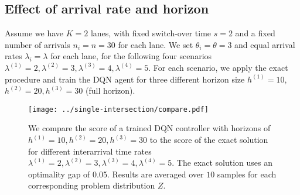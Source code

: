 \documentclass{article}
\theoremstyle{definition}
\theoremstyle{plain}
\begin{document}
\subsection{Effect of arrival rate and horizon}
%
Assume we have $K=2$ lanes, with fixed switch-over time $s=2$ and a fixed number
of arrivals $n_{i}=n=30$ for each lane. We set $\theta_{i} = \theta = 3$ and
equal arrival rates $\lambda_{i} = \lambda$ for each lane, for the following
four scenarios $\lambda^{(1)} = 2, \lambda^{(2)} = 3, \lambda^{(3)} = 4, \lambda^{(4)} = 5$.
%
For each scenario, we apply the exact procedure and train the DQN agent for
three different horizon size $h^{(1)} = 10$, $h^{(2)} = 20, h^{(3)} = 30$ (full
horizon).


\begin{figure}
  \centering
  \texttt{[image: ../single-intersection/compare.pdf]}
  \caption{We compare the score of a trained DQN controller with horizons of
    $h^{(1)} = 10, h^{(2)} = 20, h^{(3)} = 30$ to the score of the exact
    solution for different interarrival time rates
    $\lambda^{(1)} = 2, \lambda^{(2)} = 3, \lambda^{(3)} = 4, \lambda^{(4)} = 5$. The exact solution
    uses an optimality gap of 0.05. Results are averaged over $10$ samples for
    each corresponding problem distribution $Z$.}
  \label{fig:dqn-learning-rates}
\end{figure}



% 
% 
\end{document}

